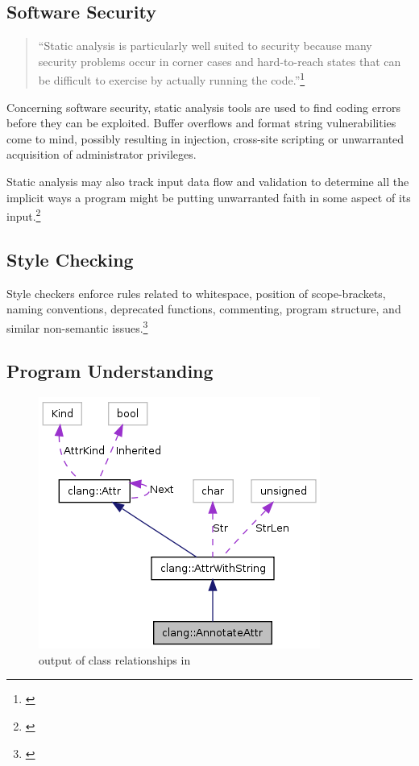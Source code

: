 \subsection{Software Security}

\begin{quotation}
``Static analysis is particularly well suited to security because many security problems occur in corner cases and hard-to-reach states that can be difficult to exercise by actually running the code.''\footnote{\citep[4]{SecureProgramming}}
\end{quotation}

Concerning software security, static analysis tools are used to find coding errors before they can be exploited. Buffer overflows and format string vulnerabilities come to mind, possibly resulting in  injection, cross-site scripting or unwarranted acquisition of administrator privileges. 

Static analysis may also track input data flow and validation to determine
all the implicit ways a program might be putting unwarranted faith in some aspect of its input.\footnote{\citep[172]{SecureProgramming}}

\subsection{Style Checking}

Style checkers enforce rules related to whitespace, position of scope-brackets, naming conventions, deprecated functions, commenting, program structure, and similar \linebreak non-semantic issues.\footnote{\citep[25]{SecureProgramming}}

\subsection{Program Understanding}

\begin{figure}
  \vspace{-5pt}
  \begin{center}
    \includegraphics[scale=0.5]{Images/ClangGraph.png}
  \end{center}
  \caption{ output of class relationships in }
  \label{fig:ClangGraph}
   \vspace{-15pt}
\end{figure}

